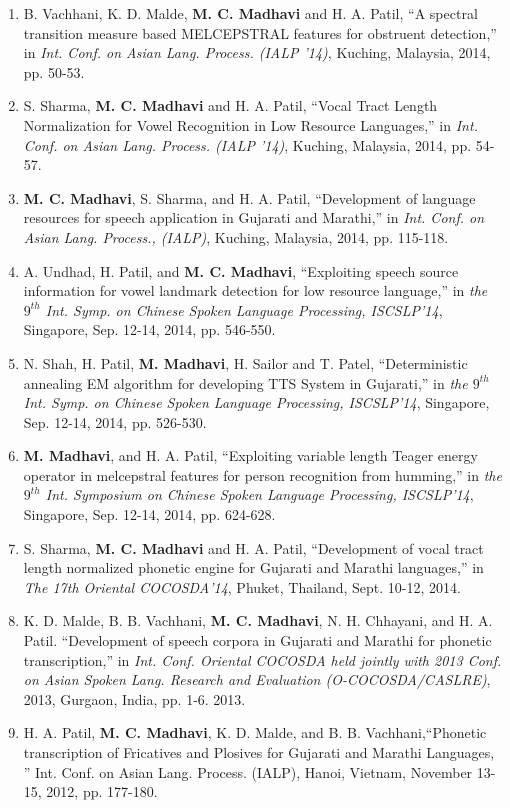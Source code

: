 \documentclass[10pt]{article}
\begin{document}
\begin{enumerate}[resume]
\item B. Vachhani, K. D. Malde, \textbf{M. C. Madhavi} and H. A. Patil, ``A spectral transition measure based MELCEPSTRAL features for obstruent detection,'' in \textit{Int. Conf. on Asian Lang. Process. (IALP '14)}, Kuching, Malaysia, 2014, pp. 50-53.
\item S. Sharma, \textbf{M. C. Madhavi} and H. A. Patil, ``Vocal Tract Length Normalization for Vowel Recognition in Low Resource Languages,'' in \textit{Int. Conf. on Asian Lang. Process. (IALP '14)}, Kuching, Malaysia, 2014, pp. 54-57.
\item \textbf{M. C. Madhavi}, S. Sharma, and H. A. Patil, ``Development of language resources for speech application in Gujarati and Marathi,''
in \textit{Int. Conf. on Asian Lang. Process., (IALP)}, Kuching, Malaysia, 2014, pp. 115-118.
\item 	A. Undhad, H. Patil, and \textbf{M. C. Madhavi}, ``Exploiting speech source information for vowel landmark detection for low resource language,'' in \textit{the $ 9^{th} $  Int. Symp. on Chinese Spoken Language Processing, ISCSLP'14},  Singapore, Sep. 12-14, 2014, pp. 546-550.
\item 	N. Shah, H. Patil, \textbf{M. Madhavi}, H. Sailor and T. Patel, ``Deterministic annealing EM algorithm for developing TTS System in Gujarati,'' in \textit{the $ 9^{th} $  Int. Symp. on Chinese Spoken Language Processing, ISCSLP'14},  Singapore, Sep. 12-14, 2014, pp. 526-530.
\item 	\textbf{M. Madhavi}, and H. A. Patil, ``Exploiting variable length Teager energy operator in melcepstral features for person recognition from humming,'' in \textit{the $ 9^{th} $  Int. Symposium on Chinese Spoken Language Processing, ISCSLP'14},  Singapore, Sep. 12-14, 2014, pp. 624-628.
\item 	S. Sharma, \textbf{M. C. Madhavi} and H. A. Patil, ``Development of vocal tract length normalized phonetic engine for Gujarati and Marathi languages,''  in \textit{The 17th Oriental COCOSDA'14}, Phuket, Thailand, Sept. 10-12, 2014.
\item K. D. Malde, B. B. Vachhani,\textbf{ M. C. Madhavi}, N. H. Chhayani, and H. A. Patil. ``Development of speech corpora in Gujarati and Marathi for phonetic transcription,'' in \textit{Int. Conf. Oriental COCOSDA held jointly with 2013 Conf. on Asian Spoken Lang. Research and Evaluation (O-COCOSDA/CASLRE)}, 2013, Gurgaon, India, pp. 1-6. 2013.
\item  H. A. Patil, \textbf{M. C. Madhavi}, K. D. Malde, and B. B. Vachhani,``Phonetic transcription of Fricatives and Plosives for Gujarati and Marathi Languages, '' Int. Conf. on Asian Lang. Process. (IALP), Hanoi, Vietnam,  November 13-15, 2012, pp. 177-180. 

\end{enumerate}
\end{document}
